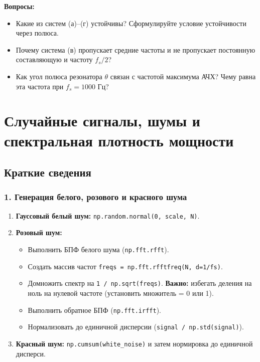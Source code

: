 \documentclass[12pt,a4paper,openany]{book}
\providecommand{\tightlist}{\setlength{\itemsep}{0pt}\setlength{\parskip}{0pt}}
\begin{document}
\textbf{Вопросы:}

\begin{itemize}
\tightlist
\item
  Какие из систем (а)--(г) устойчивы? Сформулируйте условие устойчивости через полюса.
\item
  Почему система (в) пропускает средние частоты и не пропускает постоянную составляющую и частоту \(f_s/2\)?
\item
  Как угол полюса резонатора \(\theta\) связан с частотой максимума АЧХ? Чему равна эта частота при \(f_s = 1000\) Гц?
\end{itemize}


\chapter{Случайные сигналы, шумы и спектральная плотность мощности}

\section*{Краткие сведения}

\subsection*{1. Генерация белого, розового и красного шума}

\begin{enumerate}
\def\labelenumi{\arabic{enumi}.}
\tightlist
\item
  \textbf{Гауссовый белый шум:} \texttt{np.\allowbreak{}random.\allowbreak{}normal(\allowbreak{}0,\allowbreak{}\ scale,\allowbreak{}\ N)}.
\item
  \textbf{Розовый шум:}

  \begin{itemize}
  \tightlist
  \item
    Выполнить БПФ белого шума (\texttt{np.\allowbreak{}fft.\allowbreak{}rfft}).
  \item
    Создать массив частот \texttt{freqs\ =\allowbreak{}\ np.\allowbreak{}fft.\allowbreak{}rfftfreq(\allowbreak{}N,\allowbreak{}\ d=\allowbreak{}1/\allowbreak{}fs)}.
  \item
    Домножить спектр на \texttt{1\ /\allowbreak{}\ np.\allowbreak{}sqrt(\allowbreak{}freqs)}. \textbf{Важно:} избегать деления на ноль на нулевой частоте (установить множитель = 0 или 1).
  \item
    Выполнить обратное БПФ (\texttt{np.\allowbreak{}fft.\allowbreak{}irfft}).
  \item
    Нормализовать до единичной дисперсии (\texttt{signal\ /\allowbreak{}\ np.\allowbreak{}std(\allowbreak{}signal)}).
  \end{itemize}
\item
  \textbf{Красный шум:} \texttt{np.\allowbreak{}cumsum(\allowbreak{}white\_\allowbreak{}noise)} и затем нормировка до единичной дисперси.
\end{enumerate}
\end{document}
